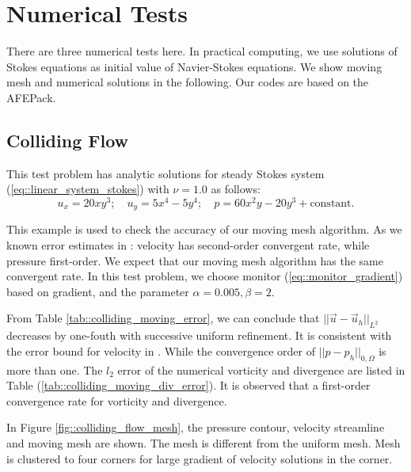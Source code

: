 \documentclass[a4paper, 11pt]{article}
\begin{document}
\section{Numerical Tests}
     There are three numerical tests here. In practical computing, 
     we use solutions of Stokes equations as initial value of
     Navier-Stokes equations.  We show moving mesh and numerical
     solutions in the following. Our codes are based on the AFEPack.

     \subsection{Colliding Flow}    
        This test problem has analytic solutions for steady Stokes system
        (\ref{eq::linear_system_stokes}) with $\nu = 1.0$ as follows:
        \begin{equation}
          u_x = 20 x y^3; \quad u_y = 5 x^4 - 5 y^4; \quad p = 60 x^2 y - 20
          y^3 + \mbox{constant}.
          \label{eq::colliding}
        \end{equation}
        
        This example is used to check the accuracy of our moving mesh
        algorithm. As we known error estimates in
        \cite{bercovier1979error}: velocity has second-order
        convergent rate, while pressure first-order. We expect that
        our moving mesh algorithm has the same convergent rate. In
        this test problem, we choose monitor
        (\ref{eq::monitor_gradient}) based on gradient, and the
        parameter $\alpha = 0.005, \beta = 2$. 
        
        From Table \ref{tab::colliding_moving_error}, we can
        conclude that $||\vec{u} - \vec{u}_h||_{L^2}$ decreases by one-fouth with
        successive uniform refinement. It is consistent with the error bound
        for velocity in \cite{bercovier1979error}. While the
        convergence order of $||p - p_h||_{0, \Omega}$ is more than
        one. The $l_2$ error of the numerical vorticity and divergence
        are listed in Table
        (\ref{tab::colliding_moving_div_error}). It is observed that a
        first-order convergence rate for vorticity and divergence.

        In Figure \ref{fig::colliding_flow_mesh}, the pressure
        contour, velocity streamline and moving mesh are shown. The
        mesh is different from the uniform mesh. Mesh is clustered to
        four corners for large gradient of velocity solutions in the
        corner.
\end{document}
